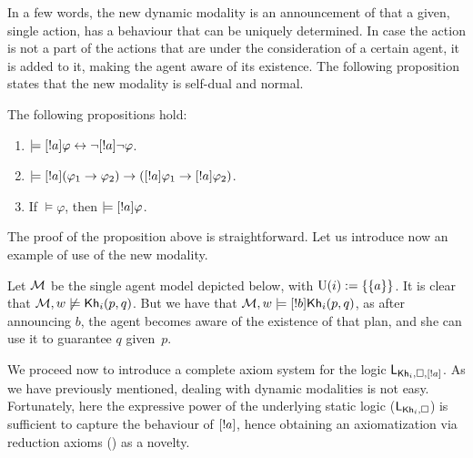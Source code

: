 \medskip

In a few words, the new dynamic modality is an announcement of that a given, single action, has a behaviour that can be uniquely determined. In case the action is not a part of the actions that are under the consideration of a certain agent, it is added to it, making the agent aware of its existence. 
The following proposition states that the new modality is self-dual and normal.

\medskip

\begin{proposition} The following propositions hold:
\begin{enumerate}
\item $\models [!a]\varphi \leftrightarrow \neg[!a]\neg\varphi$. 
\item $\models [!a](\varphi_1 \rightarrow \varphi_2) \rightarrow ([!a]\varphi_1 \rightarrow [!a]\varphi_2)$.
\item If $\models \varphi$, then $\models [!a]\varphi$.
\end{enumerate}
\end{proposition}

\medskip

The proof of the proposition above is straightforward. Let us introduce now an example of use of the new modality.

\medskip

\begin{example}
Let $\mathcal{M}$ be the single agent model depicted below, with $\operatorname{U}(i):=\{ \{ a \} \}$. It is clear that $\mathcal{M},w\not\models{\sf Kh}_i(p,q)$. But we have that $\mathcal{M},w\models[!b]{\sf Kh}_i(p,q)$, as after announcing $b$, the agent becomes aware of the existence of that plan, and she can use it to guarantee $q$ given~$p$. 
\begin{center}
\end{center} 
\end{example}

We proceed now to introduce a complete axiom system for the logic $\mathsf{L}_{{\sf Kh}_i,\square,[!a]}$. As we have previously mentioned, dealing with dynamic modalities is not easy. Fortunately, here the expressive power of the underlying static logic ($\mathsf{L}_{{\sf Kh}_i,\square}$) is sufficient to capture the behaviour of $[!a]$, hence obtaining an axiomatization via reduction axioms () as a novelty.

